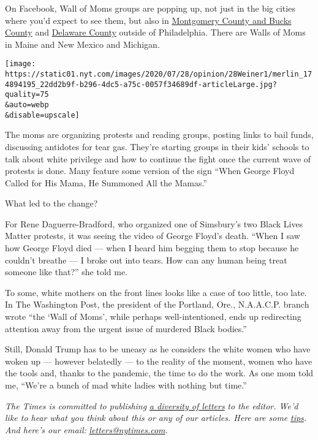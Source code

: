 On Facebook, Wall of Moms groups are popping up, not just in the big
cities where you'd expect to see them, but also in
\href{https://www.facebook.com/groups/1170791863291062}{Montgomery
County and Bucks County} and
\href{https://www.facebook.com/groups/3261681747203912}{Delaware County}
outside of Philadelphia. There are Walls of Moms in Maine and New Mexico
and Michigan.

\texttt{[image: https://static01.nyt.com/images/2020/07/28/opinion/28Weiner1/merlin\_174894195\_22dd2b9f-b296-4dc5-a75c-0057f34689df-articleLarge.jpg?quality=75\\\&auto=webp\\\&disable=upscale]}

The moms are organizing protests and reading groups, posting links to
bail funds, discussing antidotes for tear gas. They're starting groups
in their kids' schools to talk about white privilege and how to continue
the fight once the current wave of protests is done. Many feature some
version of the sign ``When George Floyd Called for His Mama, He Summoned
All the Mamas.''

What led to the change?

For Rene Daguerre-Bradford, who organized one of Simsbury's two Black
Lives Matter protests, it was seeing the video of George Floyd's death.
``When I saw how George Floyd died --- when I heard him begging them to
stop because he couldn't breathe --- I broke out into tears. How can any
human being treat someone like that?'' she told me.

To some, white mothers on the front lines looks like a case of too
little, too late. In The Washington Post, the president of the Portland,
Ore., N.A.A.C.P. branch wrote ``the `Wall of Moms', while perhaps
well-intentioned, ends up redirecting attention away from the urgent
issue of murdered Black bodies.''

Still, Donald Trump has to be uneasy as he considers the white women who
have woken up --- however belatedly --- to the reality of the moment,
women who have the tools and, thanks to the pandemic, the time to do the
work. As one mom told me, ``We're a bunch of mad white ladies with
nothing but time.''

\emph{The Times is committed to publishing}
\href{https://www.nytimes.com/2019/01/31/opinion/letters/letters-to-editor-new-york-times-women.html}{\emph{a
diversity of letters}} \emph{to the editor. We'd like to hear what you
think about this or any of our articles. Here are some}
\href{https://help.nytimes.com/hc/en-us/articles/115014925288-How-to-submit-a-letter-to-the-editor}{\emph{tips}}\emph{.
And here's our email:}
\href{mailto:letters@nytimes.com}{\emph{letters@nytimes.com}}\emph{.}

